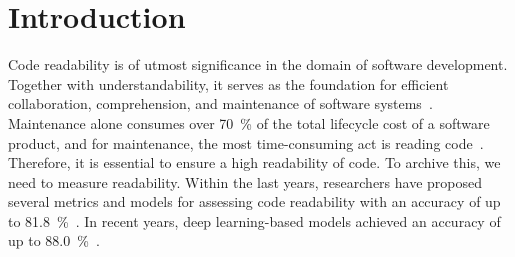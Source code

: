\documentclass[%
class=scrreprt,
chapterprefix=false,%
open=right,%
twoside=true,%
paper=a4,%
logofile={Logo\_zentral\_farbig\_EN.png},%
thesistype=master,%
UKenglish,%
]{se2thesis}
\theoremstyle{definition}
\newcommand{\citeclassicmodels}{\cite{buse2009learning, posnett2011simpler, dorn2012general, scalabrino2018comprehensive}\xspace}
\newcommand{\citedeepmodels}{\cite{mi2018inception, mi2018improving, sharma2020egan, mi2022towards, mi2022rank, mi2023graph}\xspace}
\newcommand{\numSamples}{69k\xspace}
\begin{document}
	\begin{abstract}
		
		
		Deep learning-based models are achieving increasingly superior accuracy in classifying the readability of code.
		Recent research focuses primarily on different model architectures to improve code readability classification. All models use (parts of) the same labeled dataset, consisting of 421 code snippets.
		However, deep learning-based approaches improve with a large amount of data.
		Therefore, a larger labeled dataset could greatly advance the research field of code readability classification.
		
		We investigate using a new dataset consisting of \numSamples code snippets with its novel generation approach.
		The generation approach involves mining and modifying code snippets from public GitHub repositories. We validate the generated dataset using a survey with 200 participants and by training and evaluating a state-of-the-art code readability classification model both with and without the new dataset.
		In the future, our dataset might increase the accuracy of all readability classification models.

	\end{abstract}
	
	\mainmatter
	
	\tableofcontents

\chapter{Introduction} \label{Introduction}
	Code readability is of utmost significance in the domain of software development.
	Together with understandability, it serves as the foundation for efficient collaboration, comprehension, and maintenance of software systems~\cite{posnett2011simpler, aggarwal2002integrated}. 
	Maintenance alone consumes over 70~\% of the total lifecycle cost of a software product, and for maintenance, the most time-consuming act is reading code~\cite{buse2009learning, deimel1985uses, rugaber2000use, boehm2001defect}.
	Therefore, it is essential to ensure a high readability of code. To archive this, we need to measure readability.
	Within the last years, researchers have proposed several metrics and models for assessing code readability with an accuracy of up to 81.8~\%~\citeclassicmodels. In recent years, deep learning-based models achieved an accuracy of up to 88.0~\%~\citedeepmodels.
	
\end{document}
